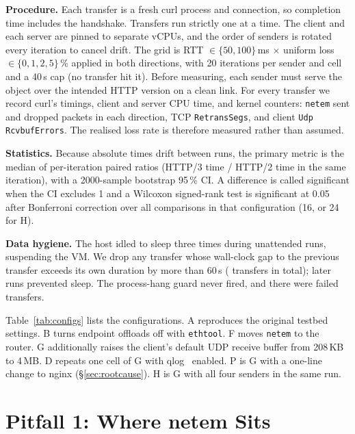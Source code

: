 \documentclass[conference]{IEEEtran}
\newcommand{\hthree}{HTTP/3}
\newcommand{\htwo}{HTTP/2}
\begin{document}
\textbf{Procedure.} Each transfer is a fresh curl process and connection, so completion time includes the handshake.
Transfers run strictly one at a time. The client and each server are pinned to separate vCPUs, and the order of senders is
rotated every iteration to cancel drift. The grid is RTT $\in\{50, 100\}$\,ms $\times$ uniform loss
$\in\{0,1,2,5\}$\,\% applied in both directions, with 20 iterations per sender and cell and a 40\,s cap (no transfer hit
it). Before measuring, each sender must serve the object over the intended HTTP version on a clean link. For every
transfer we record curl's timings, client and server CPU time, and kernel counters: \texttt{netem} sent and dropped
packets in each direction, TCP \texttt{RetransSegs}, and client \texttt{Udp RcvbufErrors}. The realised loss rate is
therefore measured rather than assumed.

\textbf{Statistics.} Because absolute times drift between runs, the primary metric is the median of per-iteration paired
ratios (\hthree{} time / \htwo{} time in the same iteration), with a 2000-sample bootstrap 95\,\% CI. A difference is called
significant when the CI excludes 1 and a Wilcoxon signed-rank test is significant at 0.05 after Bonferroni correction over
all comparisons in that configuration (16, or 24 for H).

\textbf{Data hygiene.} The host idled to sleep three times during unattended runs, suspending the VM. We drop any transfer
whose wall-clock gap to the previous transfer exceeds its own duration by more than 60\,s (\Excluded{} transfers in total);
later runs prevented sleep. The process-hang guard never fired, and there were \Failures{} failed transfers.

\begin{table}[t]
\centering
\caption{Configurations. $n$ = transfers after exclusions.}
\label{tab:configs}
\footnotesize

\end{table}

Table~\ref{tab:configs} lists the configurations. A reproduces the original testbed settings. B turns endpoint offloads off
with \texttt{ethtool}. F moves \texttt{netem} to the router. G additionally raises the client's default UDP receive buffer
from 208\,KB to 4\,MB. D repeats one cell of G with qlog~\cite{qlog} enabled. P is G with a one-line change to nginx
(\S\ref{sec:rootcause}). H is G with all four senders in the same run.

\section{Pitfall 1: Where netem Sits}\label{sec:placement}
\end{document}
